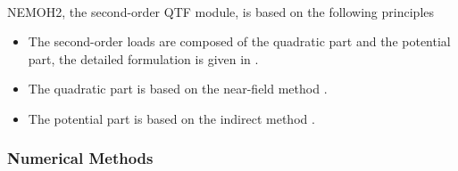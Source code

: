 \documentclass[12pt,a4paper,titlepage]{article}
\begin{document}
\ \\
NEMOH2, the second-order QTF module, is based on the following principles
\begin{itemize}
\item The second-order loads are composed of the quadratic part and the potential part, the detailed formulation is given in \cite{Kurnia22_JH,Kurnia22}.
\item The quadratic part is based on the near-field method \cite{CHEN88}.
\item The potential part is based on the
indirect method \cite{CHEN88,MOLIN79}.
\end{itemize}

\subsubsection*{Numerical Methods}
\end{document}
